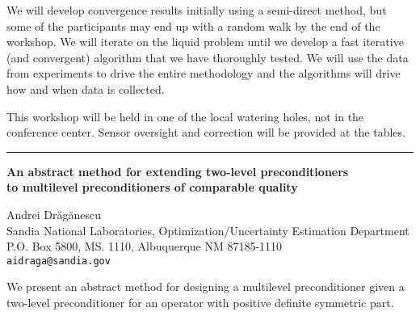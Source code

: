 \documentclass[twosided]{report}
\begin{document}
We will develop convergence results initially using a
semi-direct method, but some of the participants may end up
with a random walk by the end of the workshop.  We will
iterate on the liquid problem until we develop a fast
iterative (and convergent) algorithm that we have thoroughly
tested.  We will use the data from experiments to drive the
entire methodology and the algorithms will drive how and
when data is collected.

This workshop will be held in one of the local watering
holes, not in the conference center.  Sensor oversight and
correction will be provided at the tables.



	\begin{center} \rule{6in}{1pt} \end{center}

\begin{center}
{\large			%
{\bf An abstract method for extending two-level preconditioners \\
to multilevel preconditioners of comparable quality}}

	Andrei Dr{\u a}g{\u a}nescu \\
	Sandia National Laboratories,
	Optimization/Uncertainty Estimation Department \\
	P.O. Box 5800, MS. 1110, Albuquerque NM 87185-1110 \\
	{\tt aidraga@sandia.gov}
\end{center}
We present an abstract method for designing a multilevel
preconditioner given a two-level preconditioner for an
operator with positive definite symmetric part.
\end{document}
